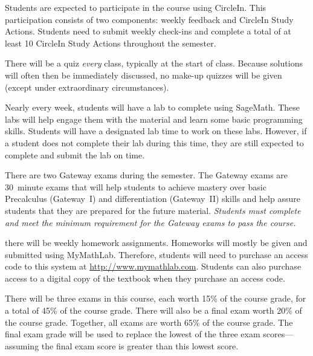 \documentclass[11pt,letterpaper]{article}
\begin{document}
Students are expected to participate in the course using CircleIn. This participation consists of two components: weekly feedback and CircleIn Study Actions. Students need to submit weekly check-ins and complete a total of at least 10 CircleIn Study Actions throughout the semester. 
\pspace



There will be a quiz \textit{every} class, typically at the start of class. Because solutions will often then be immediately discussed, no make-up quizzes will be given (except under extraordinary circumstances). \pspace



Nearly every week, students will have a lab to complete using SageMath. These labs will help engage them with the material and learn some basic programming skills. Students will have a designated lab time to work on these labs. However, if a student does not complete their lab during this time, they are still expected to complete and submit the lab on time.
\pspace



There are two Gateway exams during the semester. The Gateway exams are 30~minute exams that will help students to achieve mastery over basic Precalculus (Gateway~I) and differentiation (Gateway~II) skills and help assure students that they are prepared for the future material. {\itshape Students must complete and meet the minimum requirement for the Gateway exams to pass the course.}
\pspace


there will be weekly homework assignments. Homeworks will mostly be given and submitted using MyMathLab. Therefore, students will need to purchase an access code to this system at \url{http://www.mymathlab.com}. Students can also purchase access to a digital copy of the textbook when they purchase an access code.
\pspace


There will be three exams in this course, each worth 15\% of the course grade, for a total of 45\% of the course grade. There will also be a final exam worth 20\% of the course grade. Together, all exams are worth 65\% of the course grade. The final exam grade will be used to replace the lowest of the three exam scores---assuming the final exam score is greater than this lowest score.
\pspace
\end{document}
